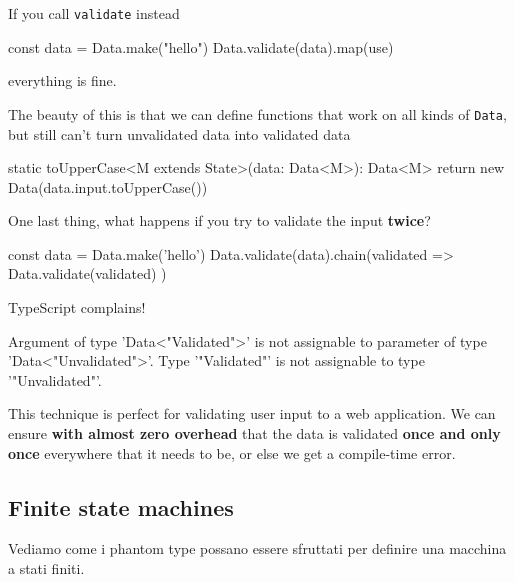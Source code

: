 \documentclass[12pt]{article}
\theoremstyle{definition}
\newenvironment{code}
  {\vspace{0.5cm} \VerbatimEnvironment\begin{typescriptcode}}
  {\end{typescriptcode} \vspace{0.2cm}}
\begin{document}
If you call \texttt{validate} instead

\begin{code}
const data = Data.make("hello")
Data.validate(data).map(use)
\end{code}

everything is fine.

The beauty of this is that we can define functions that work on all kinds of \texttt{Data},
but still can't turn unvalidated data into validated data

\begin{code}
static toUpperCase<M extends State>(data: Data<M>): Data<M> {
  return new Data(data.input.toUpperCase())
}
\end{code}

One last thing, what happens if you try to validate the input \textbf{twice}?

\begin{code}
const data = Data.make('hello')
Data.validate(data).chain(validated =>
  Data.validate(validated)
)
\end{code}

TypeScript complains!

\begin{code}
[ts]
Argument of type 'Data<"Validated">' is not assignable
  to parameter of type 'Data<"Unvalidated">'.
  Type '"Validated"' is not assignable to type '"Unvalidated"'.
\end{code}

This technique is perfect for validating user input to a web application.
We can ensure \textbf{with almost zero overhead} that the data is validated \textbf{once and only once} everywhere that it needs to be,
or else we get a compile-time error.

\subsection{Finite state machines}

Vediamo come i phantom type possano essere sfruttati per definire una macchina a stati finiti.
\end{document}
